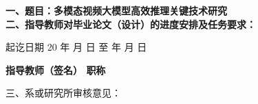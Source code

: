 \cleardoublepage{}

{
    \bfseries
    \noindent 一、题目：多模态视频大模型高效推理关键技术研究 \\
    \noindent 二、指导教师对毕业论文（设计）的进度安排及任务要求：\\

    \vskip 50mm

    \noindent 起讫日期 20 \quad 年 \quad  月 \quad  日 \quad 至  \quad  年 \quad  月  \quad 日
    \begin{flushright}
        \bfseries {}
            指导教师（签名） \underline{} 职称 \underline{}
    \end{flushright}

    \noindent 三、系或研究所审核意见：\\

    \mbox{} \vfill
    \signature{负责人（签名）}
}
